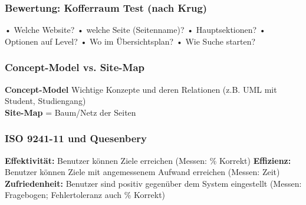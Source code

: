 
\subsubsection{Bewertung: Kofferraum Test (nach Krug)}
• Welche Website?
• welche Seite (Seitenname)?
• Hauptsektionen?
• Optionen auf Level?
• Wo im Übersichtsplan?
• Wie Suche starten?

\subsubsection{Concept-Model vs. Site-Map}
\textbf{Concept-Model} Wichtige Konzepte und deren Relationen (z.B. UML mit Student, Studiengang)\\
\textbf{Site-Map} = Baum/Netz der Seiten


\subsubsection{ISO 9241-11 und Quesenbery}
\textbf{Effektivität:} Benutzer können Ziele erreichen (Messen: \% Korrekt)
\textbf{Effizienz:} Benutzer können Ziele mit angemessenem Aufwand erreichen (Messen: Zeit)
\textbf{Zufriedenheit:} Benutzer sind positiv gegenüber dem System eingestellt (Messen: Fragebogen; Fehlertoleranz auch \% Korrekt)
